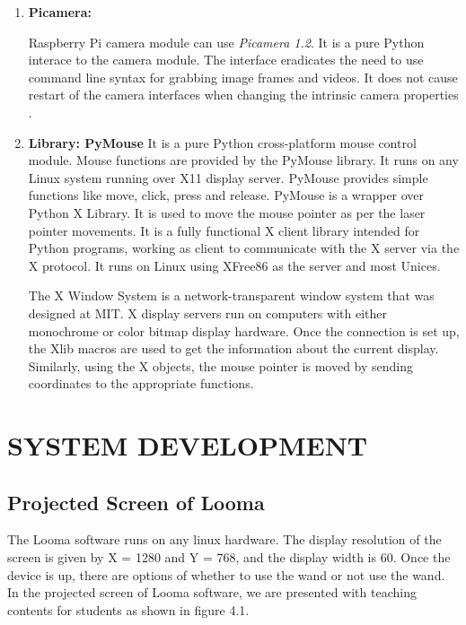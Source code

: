 \documentclass[12pt, a4paper]{article}
\begin{document}
\begin{enumerate}
\item \textbf{Picamera:}

Raspberry Pi camera module can use \emph{Picamera 1.2}. It is a pure Python interace to the camera module. The interface eradicates the need to use command line syntax for grabbing image frames and videos. It does not cause restart of the camera interfaces when changing the intrinsic camera properties
. 
\item \textbf{Library: PyMouse}
It is a pure Python cross-platform mouse control module. Mouse functions are provided by the PyMouse library. It runs on any Linux system running over X11 display server. PyMouse provides simple functions like move, click, press and release. PyMouse is a wrapper over Python X Library. It is used to move the mouse pointer as per the laser pointer movements. It is a fully functional X client library intended for Python programs, working as client to communicate with the X server via the X protocol. It runs on Linux using XFree86 as the server and most Unices.


The X Window System is a network-transparent window system that was designed at MIT. X display servers run on computers with either monochrome or color bitmap display hardware. Once the connection is set up, the Xlib macros are used to get the information about the current display. Similarly, using the X objects, the mouse pointer is moved by sending coordinates to the appropriate functions. 

\end{enumerate}
\newpage
\section{SYSTEM DEVELOPMENT}
\subsection{Projected Screen of Looma}
The Looma software runs on any linux hardware. The display resolution of the screen is given by X = 1280 and Y = 768, and the display width is 60. Once the device is up, there are options of whether to use the wand or not use the wand. In the projected screen of Looma software, we are presented with teaching contents for students as shown in figure 4.1.
\end{document}
